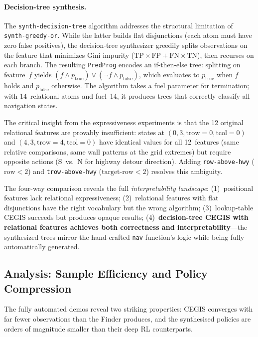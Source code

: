 \paragraph{Decision-tree synthesis.}
The \texttt{synth-decision-tree} algorithm addresses the structural limitation of \texttt{synth-greedy-or}.  While the latter builds flat disjunctions (each atom must have zero false positives), the decision-tree synthesizer greedily splits observations on the feature that minimizes Gini impurity ($\text{TP}\times\text{FP} + \text{FN}\times\text{TN}$), then recurses on each branch.  The resulting \texttt{PredProg} encodes an if-then-else tree: splitting on feature~$f$ yields $(f \wedge p_{\text{true}}) \vee (\neg f \wedge p_{\text{false}})$, which evaluates to $p_{\text{true}}$ when $f$ holds and $p_{\text{false}}$ otherwise.  The algorithm takes a fuel parameter for termination; with 14~relational atoms and fuel~14, it produces trees that correctly classify all navigation states.

The critical insight from the expressiveness experiments is that the 12 original relational features are provably insufficient: states at $(0, 3, \text{trow}{=}0, \text{tcol}{=}0)$ and $(4, 3, \text{trow}{=}4, \text{tcol}{=}0)$ have identical values for all 12~features (same relative comparisons, same wall patterns at the grid extremes) but require opposite actions (S~vs.~N for highway detour direction).  Adding \texttt{row-above-hwy} ($\text{row} < 2$) and \texttt{trow-above-hwy} ($\text{target-row} < 2$) resolves this ambiguity.

\noindent The four-way comparison reveals the full \emph{interpretability landscape}: (1)~positional features lack relational expressiveness; (2)~relational features with flat disjunctions have the right vocabulary but the wrong algorithm; (3)~lookup-table CEGIS succeeds but produces opaque results; (4)~\textbf{decision-tree CEGIS with relational features achieves both correctness and interpretability}---the synthesized trees mirror the hand-crafted \texttt{nav} function's logic while being fully automatically generated.


\subsection{Analysis: Sample Efficiency and Policy Compression}
\label{sec:analysis-compression}

The fully automated demos reveal two striking properties: CEGIS converges with far fewer observations than the Finder produces, and the synthesised policies are orders of magnitude smaller than their deep RL counterparts.

